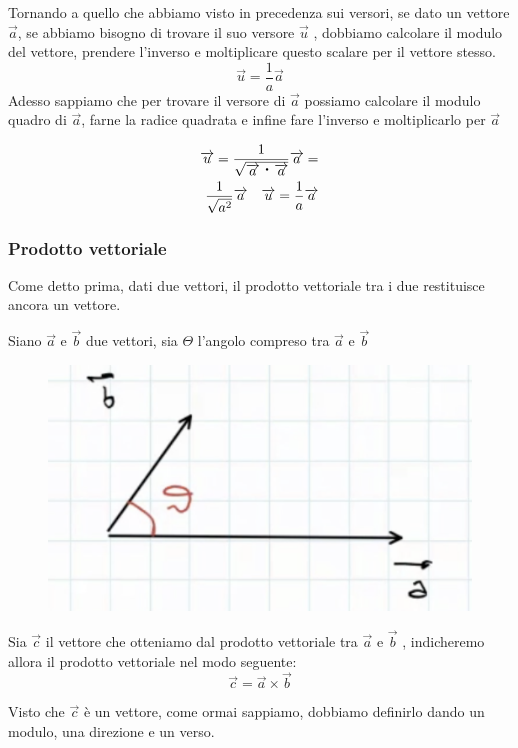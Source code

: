 \documentclass[a4paper]{book}
\newcommand{\prodscal}{\text{\large{\textbf{\textperiodcentered}}}} %
\begin{document}
Tornando a quello che abbiamo visto in precedenza sui versori, se dato un vettore $\overrightarrow{a} $, se abbiamo bisogno di trovare il suo versore $ \overrightarrow{u} $ , dobbiamo calcolare il modulo del vettore, prendere l'inverso e moltiplicare questo scalare per il vettore stesso. 
$$ \overrightarrow{u} = \frac{1}{a} \overrightarrow{a} $$
Adesso sappiamo che per trovare il versore di $\overrightarrow{a}$ possiamo calcolare il modulo quadro di $ \overrightarrow{a }$, farne la radice quadrata e infine fare l'inverso e moltiplicarlo per $\overrightarrow{a}$

\begin{align*}
\overrightarrow{u} = \frac{1}{\sqrt{ \overrightarrow{a} \prodscal \overrightarrow{a}}} \overrightarrow{a} = \\
 \frac{1}{\sqrt{a^{2}}} \overrightarrow{a} \quad \overrightarrow{u} = \frac{1}{a} \overrightarrow{a}  
\end{align*}

\subsubsection{Prodotto vettoriale}
Come detto prima, dati due vettori, il prodotto vettoriale tra i due restituisce ancora un vettore.

Siano $ \overrightarrow{a}$ e $\overrightarrow{b} $ due vettori, sia $ \Theta $ l'angolo compreso tra $ \overrightarrow{a} $ e $ \overrightarrow{b} $

\begin{figure}[h]
\begin{center}
\includegraphics[width = 0.5 \textwidth]{vettoriale1}
\label{fig:vettoriale1}
\end{center}
\end{figure}

Sia $ \overrightarrow{c} $ il vettore che otteniamo dal prodotto vettoriale tra $ \overrightarrow{a} $ e $ \overrightarrow{b} $ , indicheremo allora il prodotto vettoriale nel modo seguente:
$$ \overrightarrow{c} = \overrightarrow{a} \times \overrightarrow{b} $$

Visto che $ \overrightarrow{c} $ è un vettore, come ormai sappiamo, dobbiamo definirlo dando un modulo, una direzione e un verso.
\end{document}
